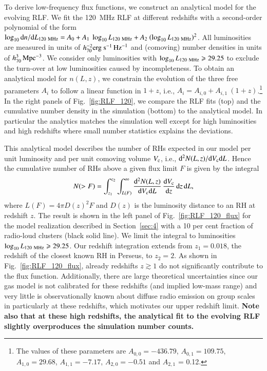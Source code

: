 \documentclass[useAMS,usenatbib]{mn2e}
\begin{document}
To derive low-frequency flux functions, we construct an analytical model for the
evolving RLF. We fit the 120~MHz RLF at different redshifts with a second-order
polynomial of the form $\log_{10} {\mathrm{d}}n/{\mathrm{d}}L_{120~{\mathrm{MHz}}} = A_{0} +
A_{1}~\log_{10} L_{120~{\mathrm{MHz}}} + A_{2}~(\log_{10} L_{120~{\mathrm{MHz}}})^{2}$.
All luminosities are measured in units of $h_{70}^{-2}
{\mathrm{erg~s}}^{-1}\,{\mathrm{Hz}}^{-1}$ and (comoving) number densities in units of
$h_{70}^{3}\,{\mathrm{Mpc}}^{-3}$. We consider only luminosities with $\log_{10}
L_{120~{\mathrm{MHz}}} \geqslant 29.25$ to exclude the turn-over at low luminosities
caused by incompleteness. To obtain an analytical model for $n(L,z)$, we
constrain the evolution of the three free parameters $A_i$ to follow a linear
function in $1+z$, i.e., $A_{i} = A_{i,0} + A_{i,1}~(1+z)$.\footnote{The values
  of these parameters are $A_{0,0} = -436.79$, $A_{0,1} = 109.75$, $A_{1,0} =
  29.68$, $A_{1,1} = -7.17$, $A_{2,0} = -0.51$ and $A_{2,1}$ = 0.12.} In the
right panels of Fig.~\ref{fig:RLF_120}, we compare the RLF fits (top) and the
cumulative number density in the simulation (bottom) to the analytical model. In
particular the analytics matches the simulation well except for high
luminosities and high redshifts where small number statistics explains the
deviations.

This analytical model describes the number of RHs expected in our model per unit
luminosity and per unit comoving volume $V_{{\mathrm{c}}}$, i.e., ${\mathrm{d}}^2N(L,z)
/{\mathrm{d}}V_{{\mathrm{c}}}{\mathrm{d}}L$. Hence the cumulative number of RHs above a given flux
limit $F$ is given by the integral
\begin{equation}
N(>F)  =  \int_{z_1}^{z_2} \int_{L(F)}^{\infty} 
\frac{{\mathrm{d}}^2N(L,z)}{{\mathrm{d}}V_{{\mathrm{c}}}{\mathrm{d}}L}\,
\frac{{\mathrm{d}}V_{{\mathrm{c}}}}{{\mathrm{d}}z}\, {\mathrm{d}}z\, {\mathrm{d}}L ,
\label{eq:NtotRH}
\end{equation}
where $L(F) = 4 \pi D(z)^2 F$ and $D(z)$ is the luminosity distance to an RH at
redshift $z$.  The result is shown in the left panel of
Fig.~\ref{fig:RLF_120_flux} for the model realization described in
Section~\ref{sec:4} with a 10 per cent fraction of radio-loud clusters (black
solid line). We limit the integral to luminosities $\log_{10} L_{120~{\mathrm{MHz}}}
\geqslant 29.25$. Our redshift integration extends from $z_{1} = 0.018$, the redshift
of the closest known RH in Perseus, to $z_{2} = 2$. As shown in
Fig.~\ref{fig:RLF_120_flux}, already redshifts $z\gtrsim1$ do not significantly
contribute to the flux function. Additionally, there are large theoretical
uncertainties since our gas model is not calibrated for these redshifts (and
implied low-mass range) and very little is observationally known about diffuse
radio emission on group scales in particularly at these redshifts, which
motivates our upper redshift limit. {\bf Note also that at these high redshifts,
  the analytical fit to the evolving RLF slightly overproduces the simulation
  number counts.}
\end{document}
